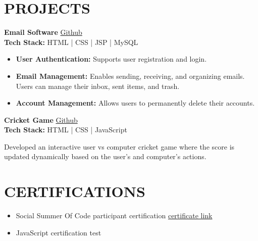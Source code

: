 \documentclass[a4paper,10pt]{article}
\begin{document}
	\section*{PROJECTS}
	\begin{multicols}{2}
		
		
		\noindent\textbf{Email Software} \hfill \href{https://github.com/Shivakumarjagadam/WEB-TECHNOLOGY/tree/main/webTechnologies/projects_tomcat/GmailMini_project}{Github} \\
		
		
		\textbf{Tech Stack:} HTML | CSS | JSP | MySQL
		
		\begin{itemize}[leftmargin=*]
			\item \textbf{User Authentication:} Supports user registration and login.
			\item \textbf{Email Management:} Enables sending, receiving, and organizing emails. Users can manage their inbox, sent items, and trash.
			\item \textbf{Account Management:} Allows users to permanently delete their accounts.
		\end{itemize}
		\columnbreak
		
		\vspace{0.2cm}
		
		
		\noindent\textbf{Cricket Game} \hfill \href{https://shivakumarjagadam.github.io/New-Cricket-game/}{Github} \\
		
		\textbf{Tech Stack:} HTML | CSS | JavaScript
		
		Developed an interactive user vs computer cricket game where the score is updated dynamically based on the user's and computer’s actions.
		
	\end{multicols}
	
	\vspace{0.2cm}
	
	\section*{CERTIFICATIONS}
	\vspace{0.2cm}
	
	\begin{itemize}[noitemsep]
		\item Social Summer Of Code participant certification
		\hfill \href{https://certificate.givemycertificate.com/c/db9a71cb-ef77-42e9-84cb-80917fa263ad}{certificate link}
		\item JavaScript certification test 
	\end{itemize}
	
\end{document}
